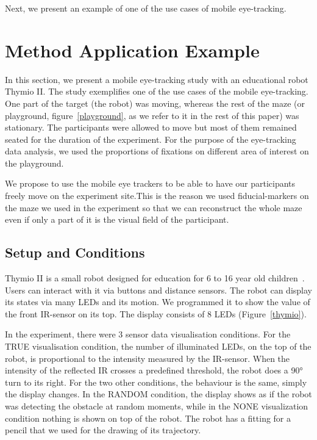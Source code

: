 \documentclass{sig-alternate}
\begin{document}
Next, we present an example of one of the use cases of mobile eye-tracking. 



\section{Method Application Example}
\label{application}

In this section, we present a mobile eye-tracking study with an educational
robot Thymio II. The study exemplifies one of the use cases of the mobile
eye-tracking. One part of the target (the robot) was moving, whereas the rest of
the maze (or playground, figure~\ref{playground}, as we refer to it in the rest
of this paper) was stationary. The participants were allowed to move but most of
them remained seated for the duration of the experiment. For the purpose of the
eye-tracking data analysis, we used the proportions of fixations on different
area of interest on the playground.

We propose to use the mobile eye trackers to be able to have our participants
freely move on the experiment site.This is the reason we used fiducial-markers
on the maze we used in the experiment so that we can reconstruct the whole maze
even if only a part of it is the visual field of the participant.

\subsection{Setup and Conditions}

Thymio II is a small robot designed for education for 6 to 16 year old
children~\cite{magnenat2012programming, riedo2012two}. Users can interact with
it via buttons and distance sensors. The robot can display its states via many
LEDs and its motion. We programmed it to show the value of the front IR-sensor
on its top. The display consists of 8 LEDs (Figure~\ref{thymio}).

In the experiment, there were 3 sensor data visualisation conditions.  For the
{\sf TRUE} visualisation condition, the number of illuminated LEDs, on the top of the
robot, is proportional to the intensity measured by the IR-sensor. When the
intensity of the reflected IR crosses a predefined threshold, the robot does a
90° turn to its right. For the two other conditions, the behaviour is the same,
simply the display changes. In the {\sf RANDOM} condition, the display shows as if the
robot was detecting the obstacle at random moments, while in the {\sf NONE}
visualization condition nothing is shown on top of the robot. The robot has a
fitting for a pencil that we used for the drawing of its trajectory.
\end{document}
